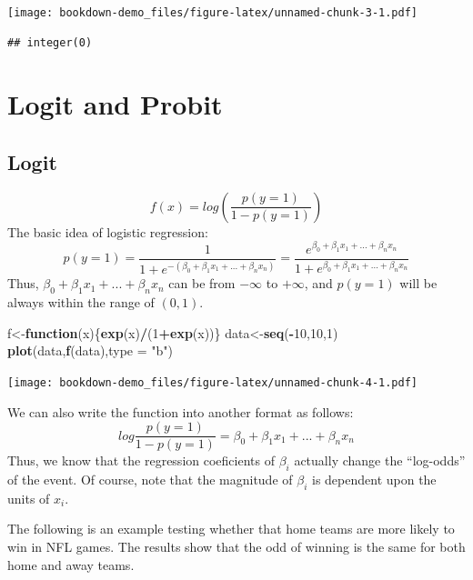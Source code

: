 \documentclass[]{book}
\newenvironment{Shaded}{\begin{snugshade}}{\end{snugshade}}
\newcommand{\ControlFlowTok}[1]{\textcolor[rgb]{0.13,0.29,0.53}{\textbf{#1}}}
\newcommand{\DataTypeTok}[1]{\textcolor[rgb]{0.13,0.29,0.53}{#1}}
\newcommand{\DecValTok}[1]{\textcolor[rgb]{0.00,0.00,0.81}{#1}}
\newcommand{\KeywordTok}[1]{\textcolor[rgb]{0.13,0.29,0.53}{\textbf{#1}}}
\newcommand{\NormalTok}[1]{#1}
\newcommand{\OperatorTok}[1]{\textcolor[rgb]{0.81,0.36,0.00}{\textbf{#1}}}
\newcommand{\StringTok}[1]{\textcolor[rgb]{0.31,0.60,0.02}{#1}}
\begin{document}
\texttt{[image: bookdown-demo\_files/figure-latex/unnamed-chunk-3-1.pdf]}

\begin{verbatim}
## integer(0)
\end{verbatim}

\hypertarget{logit-and-probit}{%
\chapter{Logit and Probit}\label{logit-and-probit}}

\hypertarget{logit}{%
\section{Logit}\label{logit}}

\[f(x)=log(\frac{p(y=1)}{1-p(y=1)})\]
The basic idea of logistic regression:
\[p(y=1)=\frac{1}{1+e^{-(\beta_0+\beta_1x_1+...+\beta_nx_n)}}=\frac{e^{\beta_0+\beta_1x_1+...+\beta_nx_n}}{1+e^{\beta_0+\beta_1x_1+...+\beta_nx_n}}\]
Thus, \(\beta_0+\beta_1x_1+...+\beta_nx_n\) can be from \(-\infty\) to \(+\infty\), and \(p(y=1)\) will be always within the range of \((0,1)\).

\begin{Shaded}
\begin{Highlighting}[]
\NormalTok{f<-}\ControlFlowTok{function}\NormalTok{(x)\{}\KeywordTok{exp}\NormalTok{(x)}\OperatorTok{/}\NormalTok{(}\DecValTok{1}\OperatorTok{+}\KeywordTok{exp}\NormalTok{(x))\}}
\NormalTok{data<-}\KeywordTok{seq}\NormalTok{(}\OperatorTok{-}\DecValTok{10}\NormalTok{,}\DecValTok{10}\NormalTok{,}\DecValTok{1}\NormalTok{)}
\KeywordTok{plot}\NormalTok{(data,}\KeywordTok{f}\NormalTok{(data),}\DataTypeTok{type =} \StringTok{"b"}\NormalTok{)}
\end{Highlighting}
\end{Shaded}

\texttt{[image: bookdown-demo\_files/figure-latex/unnamed-chunk-4-1.pdf]}

We can also write the function into another format as follows:
\[log \frac{p(y=1)}{1-p(y=1)}= \beta_0+\beta_1x_1+...+\beta_nx_n\]
Thus, we know that the regression coeficients of \(\beta_i\) actually change the ``log-odds'' of the event. Of course, note that the magnitude of \(\beta_i\) is dependent upon the units of \(x_i\).

The following is an example testing whether that home teams are more likely to win in NFL games. The results show that the odd of winning is the same for both home and away teams.
\end{document}
